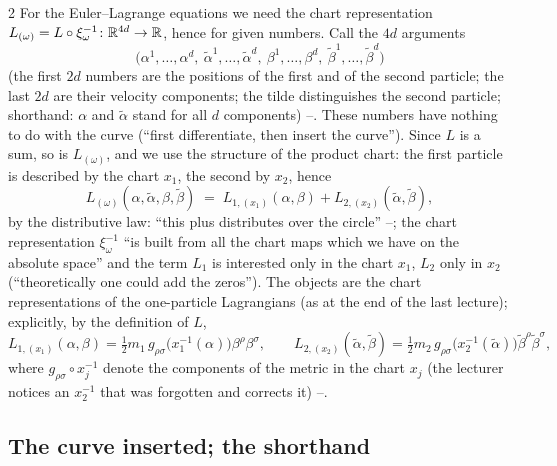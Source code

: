 \begin{paracol}{2}
For the Euler--Lagrange equations we need the chart representation $L_{(\omega)}=L\circ\xi_\omega^{-1}\colon\mathbb{R}^{4d}\to\mathbb{R}$, hence for given numbers. Call the $4d$ arguments
\begin{equation}\label{eq:mp-args}
  \bigl(\alpha^1,\dots,\alpha^d,\ \tilde\alpha^1,\dots,\tilde\alpha^d,\ \beta^1,\dots,\beta^d,\ \tilde\beta^1,\dots,\tilde\beta^d\bigr)
\end{equation}
(the first $2d$ numbers are the positions of the first and of the second particle; the last $2d$ are their velocity components; the tilde distinguishes the second particle; shorthand: $\alpha$ and $\tilde\alpha$ stand for all $d$ components) --. These numbers have nothing to do with the curve (``first differentiate, then insert the curve''). Since $L$ is a sum, so is $L_{(\omega)}$, and we use the structure of the product chart: the first particle is described by the chart $x_1$, the second by $x_2$, hence
\begin{equation}\label{eq:mp-Lomega}
  L_{(\omega)}(\alpha,\tilde\alpha,\beta,\tilde\beta)\;=\;L_{1,(x_1)}(\alpha,\beta)+L_{2,(x_2)}(\tilde\alpha,\tilde\beta),
\end{equation}
by the distributive law: ``this plus distributes over the circle'' --; the chart representation $\xi_\omega^{-1}$ ``is built from all the chart maps which we have on the absolute space'' and the term $L_1$ is interested only in the chart $x_1$, $L_2$ only in $x_2$ (``theoretically one could add the zeros''). The objects are the chart representations of the one-particle Lagrangians (as at the end of the last lecture); explicitly, by the definition of $L$,
\begin{equation}\label{eq:mp-Lchart}
  L_{1,(x_1)}(\alpha,\beta)=\tfrac12m_1\,g_{\rho\sigma}\!\bigl(x_1^{-1}(\alpha)\bigr)\beta^\rho\beta^\sigma,\qquad
  L_{2,(x_2)}(\tilde\alpha,\tilde\beta)=\tfrac12m_2\,g_{\rho\sigma}\!\bigl(x_2^{-1}(\tilde\alpha)\bigr)\tilde\beta^\rho\tilde\beta^\sigma ,
\end{equation}
where $g_{\rho\sigma}\circ x_j^{-1}$ denote the components of the metric in the chart $x_j$ (the lecturer notices an $x_2^{-1}$ that was forgotten and corrects it) --.

\subsection{The curve inserted; the shorthand}\label{ssec:mp-curve}


\end{paracol}
